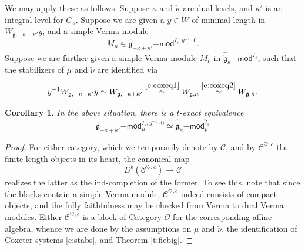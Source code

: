 \documentclass[11pt,reqno]{amsart}
\newcommand{\msf}{\mathsf}
\newcommand{\fg}{\mathfrak{g}}
\newcommand{\scc}{\mathscr{C}}
\newtheorem{cor}[subsubsection]{Corollary}
\theoremstyle{remark}
\numberwithin{equation}{section}
\begin{document}
\subsubsection{}
We may apply these as follows. Suppose $\kappa$ and $\check{\kappa}$ are dual 
levels, and $\kappa'$ is an integral level for $G_s$. Suppose we are given 
a $y \in 
\widetilde{W}$ of minimal length in $W_{\fg, -\kappa + \kappa'}y$, and 
a  simple Verma 
module 
%
\[M_\mu \in \widehat{\fg}_{-\kappa + \kappa'}\msf{-mod}^{I_s, y^{-1} \cdot 
0}. 
\]
%
Suppose we are further given a simple Verma module $M_{\check{\nu}}$ in 
$\widehat{\check{\fg}}_{\check{\kappa}}\msf{-mod}^{\check{I}_s}$, such that the 
stabilizers of $\mu$ and $\check{\nu}$ are identified via
%
\begin{equation}
\label{e:stabs} y^{-1}W_{\fg, -\kappa + \kappa'}y \simeq W_{\fg, -\kappa + 
\kappa'} \overset{\eqref{e:coxeq1}}{\simeq} W_{\fg, \kappa} 
\overset{\eqref{e:coxeq2}}{\simeq} W_{\check{\fg}, 
\check{\kappa}}. 
\end{equation}
%
\begin{cor} In the above situation, there is a $t$-exact equivalence 
	\[ \widehat{\fg}_{-\kappa + \kappa'}\msf{-mod}^{I_s, y^{-1} \cdot 
		0}_\mu \simeq 
		\widehat{\check{\fg}}_{\check{\kappa}}\msf{-mod}^{\check{I}_s}_{\check{\nu}}
	\]
	\label{c:theend}
\end{cor}

\begin{proof} For either category, which we temporarily denote by $\scc$, and 
by $\scc^{\heartsuit, c}$ the finite length objects in its heart, the canonical 
map 
	\[ D^b( \scc^{\heartsuit, c}) \rightarrow \scc
	\]
realizes the latter as the ind-completion of the former. To see this, note that 
since the blocks contain a simple Verma module, $\scc^{\heartsuit, c}$ indeed 
consists of compact objects, and the fully faithfulness may be checked from 
Verma to dual Verma modules. Either $\scc^{\heartsuit, c}$ is a block of 
Category $\mathscr{O}$ for the corresponding affine algebra, whence 
we are done by the assumptions on $\mu$ and $\check{\nu}$, the identification 
of Coxeter systems
\eqref{e:stabs}, and 
Theorem \ref{t:fiebig}. 
\end{proof}
\end{document}

